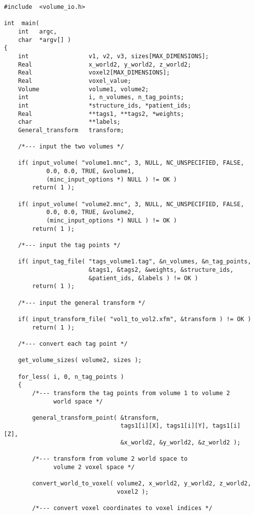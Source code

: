 {\small
\begin{verbatim}
#include  <volume_io.h>

int  main(
    int   argc,
    char  *argv[] )
{
    int                 v1, v2, v3, sizes[MAX_DIMENSIONS];
    Real                x_world2, y_world2, z_world2;
    Real                voxel2[MAX_DIMENSIONS];
    Real                voxel_value;
    Volume              volume1, volume2;
    int                 i, n_volumes, n_tag_points;
    int                 *structure_ids, *patient_ids;
    Real                **tags1, **tags2, *weights;
    char                **labels;
    General_transform   transform;

    /*--- input the two volumes */

    if( input_volume( "volume1.mnc", 3, NULL, NC_UNSPECIFIED, FALSE,
            0.0, 0.0, TRUE, &volume1,
            (minc_input_options *) NULL ) != OK )
        return( 1 );

    if( input_volume( "volume2.mnc", 3, NULL, NC_UNSPECIFIED, FALSE,
            0.0, 0.0, TRUE, &volume2,
            (minc_input_options *) NULL ) != OK )
        return( 1 );

    /*--- input the tag points */

    if( input_tag_file( "tags_volume1.tag", &n_volumes, &n_tag_points,
                        &tags1, &tags2, &weights, &structure_ids,
                        &patient_ids, &labels ) != OK )
        return( 1 );

    /*--- input the general transform */

    if( input_transform_file( "vol1_to_vol2.xfm", &transform ) != OK )
        return( 1 );

    /*--- convert each tag point */

    get_volume_sizes( volume2, sizes );

    for_less( i, 0, n_tag_points )
    {
        /*--- transform the tag points from volume 1 to volume 2
              world space */

        general_transform_point( &transform,
                                 tags1[i][X], tags1[i][Y], tags1[i][Z],
                                 &x_world2, &y_world2, &z_world2 );

        /*--- transform from volume 2 world space to
              volume 2 voxel space */

        convert_world_to_voxel( volume2, x_world2, y_world2, z_world2,
                                voxel2 );

        /*--- convert voxel coordinates to voxel indices */


\end{verbatim}}
